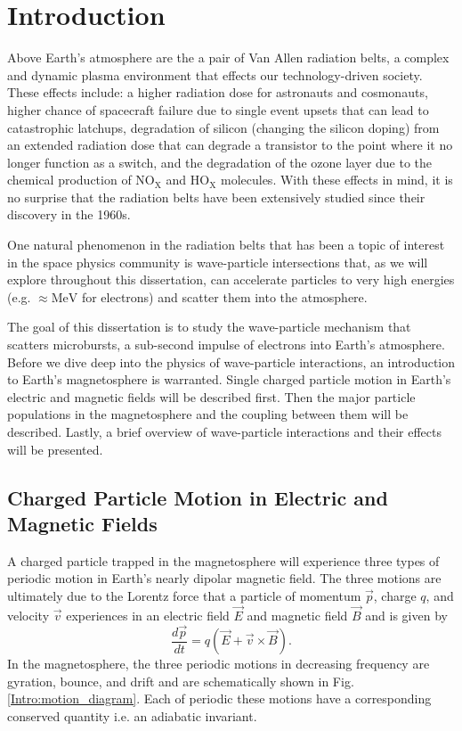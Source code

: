 \chapter{Introduction}\label{CH:introduction}
Above Earth's atmosphere are the a pair of Van Allen radiation belts, a complex and dynamic plasma environment that effects our technology-driven society. These effects include: a higher radiation dose for astronauts and cosmonauts, higher chance of spacecraft failure due to single event upsets that can lead to catastrophic latchups, degradation of silicon (changing the silicon doping) from an extended radiation dose that can degrade a transistor to the point where it no longer function as a switch, and the degradation of the ozone layer due to the chemical production of $\mathrm{NO_X}$ and $\mathrm{HO_X}$ molecules. With these effects in mind, it is no surprise that the radiation belts have been extensively studied since their discovery in the 1960s.

One natural phenomenon in the radiation belts that has been a topic of interest in the space physics community is wave-particle intersections that, as we will explore throughout this dissertation, can accelerate particles to very high energies (e.g. $\approx \mathrm{MeV}$ for electrons) and scatter them into the atmosphere.

The goal of this dissertation is to study the wave-particle mechanism that scatters microbursts, a sub-second impulse of electrons into Earth's atmosphere. Before we dive deep into the physics of wave-particle interactions, an introduction to Earth's magnetosphere is warranted. Single charged particle motion in Earth's electric and magnetic fields will be described first. Then the major particle populations in the magnetosphere and the coupling between them will be described. Lastly, a brief overview of wave-particle interactions and their effects will be presented.

\section{Charged Particle Motion in Electric and Magnetic Fields}\label{Intro:particle_motion}
A charged particle trapped in the magnetosphere will experience three types of periodic motion in Earth's nearly dipolar magnetic field. The three motions are ultimately due to the Lorentz force that a particle of momentum $\vec{p}$, charge $q$, and velocity $\vec{v}$ experiences in an electric field $\vec{E}$ and magnetic field $\vec{B}$ and is given by
\begin{equation} \label{Intro:Lorentz}
\frac{d\vec{p}}{dt} = q(\vec{E} + \vec{v} \times \vec{B}).
\end{equation} In the magnetosphere, the three periodic motions in decreasing frequency are gyration, bounce, and drift and are schematically shown in Fig. \ref{Intro:motion_diagram}. Each of periodic these motions have a corresponding conserved quantity i.e. an adiabatic invariant. 

